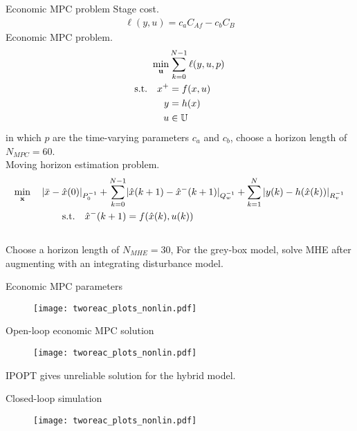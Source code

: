 \documentclass[xcolor=dvipsnames, 8pt]{beamer} %
\newcommand{\useq}{\mathbf{u}}
\newcommand{\xseq}{\mathbf{x}}
\newcommand{\bbU}{\mathbb{U}}
\begin{document}
\begin{frame}{Economic MPC problem}
Stage cost.
\begin{align*}
		\ell(y, u) = c_aC_{Af} - c_bC_B
\end{align*}
Economic MPC problem.
\begin{align*}
	\min_{\useq} & 
  \sum_{k=0}^{N-1} \ell(y, u, p) \\
	\textnormal{s.t.} \quad   x^+ &= f(x, u)\\
	y &= h(x) \\ 
	u &\in \bbU
  \end{align*}
  in which $p$ are the time-varying parameters $c_a$ and $c_b$, choose a horizon length of $N_{MPC}=60$. \\
  Moving horizon estimation problem.
  \begin{align*}
\min_{\xseq} \quad
|\bar{x}-\hat{x}(0)|_{P^{-1}_0} + \sum_{k=0}^{N-1} & |\hat{x}(k+1)-\hat{x}^{-}(k+1)|_{Q^{-1}_w} + \sum_{k=1}^{N} |y(k) - h(\hat{x}(k))|_{R^{-1}_v}\\
	  \textnormal{s.t.} \quad   \hat{x}^{-}(k+1) &= f(\hat{x}(k), u(k))\\
\end{align*}\\
Choose a horizon length of $N_{MHE}=30$, For the grey-box model,
solve MHE after augmenting with an integrating disturbance model.
\end{frame}
	
\begin{frame}{Economic MPC parameters}
	\begin{figure}
	\centering
	\texttt{[image: tworeac\_plots\_nonlin.pdf]}
	\end{figure}
\end{frame}

\begin{frame}{Open-loop economic MPC solution}
	\vspace{-0.1in}
	\begin{figure}
	\centering
	\texttt{[image: tworeac\_plots\_nonlin.pdf]}
	\end{figure}
	\vspace{-0.2in}
	IPOPT gives unreliable solution for the hybrid model.
\end{frame}

\begin{frame}{Closed-loop simulation}
	\begin{figure}
	\centering
	\texttt{[image: tworeac\_plots\_nonlin.pdf]}
	\end{figure}
\end{frame}
\end{document}
